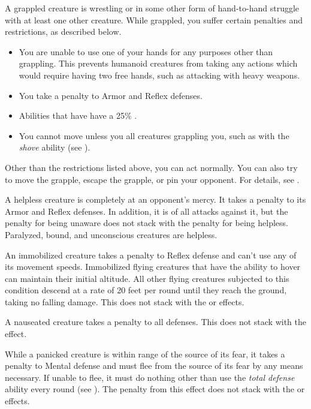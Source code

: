  A grappled creature is wrestling or in some other form of hand-to-hand struggle with at least one other creature.
While grappled, you suffer certain penalties and restrictions, as described below.
\begin{itemize}
    \item You are unable to use one of your hands for any purposes other than grappling.
        This prevents humanoid creatures from taking any actions which would require having two free hands, such as attacking with heavy weapons.
    \item You take a  penalty to Armor and Reflex defenses.
    \item Abilities that have  have a 25\% .
    \item You cannot move unless you  all creatures grappling you, such as with the \textit{shove} ability (see ).
\end{itemize}

Other than the restrictions listed above, you can act normally. You can also try to move the grapple, escape the grapple, or pin your opponent. For details, see .

 A helpless creature is completely at an opponent's mercy.
It takes a  penalty to its Armor and Reflex defenses.
In addition, it is \unaware of all attacks against it, but the penalty for being unaware does not stack with the penalty for being helpless.
Paralyzed, bound, and unconscious creatures are helpless.

 An immobilized creature takes a  penalty to Reflex defense and can't use any of its movement speeds.
Immobilized flying creatures that have the ability to hover can maintain their initial altitude.
All other flying creatures subjected to this condition descend at a rate of 20 feet per round until they reach the ground, taking no falling damage.
This does not stack with the \slowed or \decelerated effects.

 A nauseated creature takes a  penalty to all defenses.
This does not stack with the \sickened effect.

 While a panicked creature is within \rngmed range of the source of its fear, it takes a  penalty to Mental defense and must flee from the source of its fear by any means necessary.
If unable to flee, it must do nothing other than use the \textit{total defense} ability every round (see ).
The penalty from this effect does not stack with the \frightened or \panicked effects.

